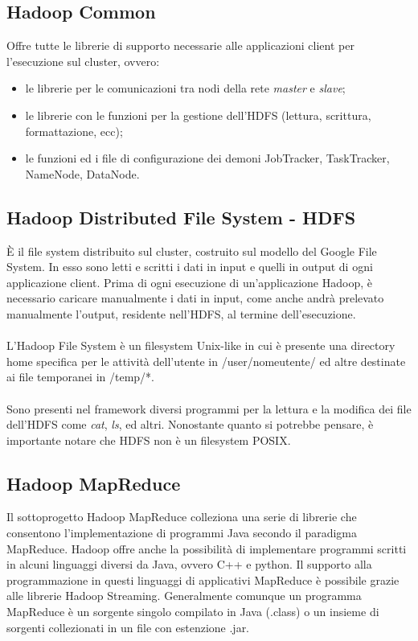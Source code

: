 \documentclass[a4paper,11pt]{report}
\begin{document}
\subsection{Hadoop Common}
Offre tutte le librerie di supporto necessarie alle applicazioni client per l'esecuzione sul cluster, ovvero:
\begin{itemize}
 \item le librerie per le comunicazioni tra nodi della rete \emph{master} e \emph{slave};
 \item le librerie con le funzioni per la gestione dell'HDFS (lettura, scrittura, formattazione, ecc); 
 \item le funzioni ed i file di configurazione dei demoni JobTracker, TaskTracker, NameNode, DataNode.
\end{itemize}
\subsection{Hadoop Distributed File System - HDFS}
È il file system distribuito sul cluster, costruito sul modello del Google File System. In esso sono letti e scritti i dati in input e
quelli in output di ogni applicazione client.
Prima di ogni esecuzione di un'applicazione Hadoop, è necessario caricare manualmente i dati in input, come anche andrà prelevato
manualmente l'output, residente nell'HDFS, al termine 
dell'esecuzione.
\paragraph{}
L'Hadoop File System è un filesystem Unix-like in cui è presente una directory home specifica per le attività dell'utente in
/user/nomeutente/ ed altre destinate ai file temporanei 
in /temp/*.
\paragraph{}
Sono presenti nel framework diversi programmi per la lettura e la modifica dei file dell'HDFS come \emph{cat}, \emph{ls}, ed altri.
Nonostante quanto si potrebbe pensare, è importante
notare che HDFS non è un filesystem POSIX.
\subsection{Hadoop MapReduce}
Il sottoprogetto Hadoop MapReduce colleziona una serie di librerie che consentono l'implementazione di programmi Java secondo il paradigma
MapReduce. Hadoop offre anche la possibilità di
implementare programmi scritti in alcuni linguaggi diversi da Java, ovvero C++ e python. Il supporto alla programmazione in questi linguaggi
di applicativi MapReduce
è possibile grazie alle librerie Hadoop Streaming. Generalmente comunque un programma MapReduce è un sorgente singolo compilato in Java
(.class) o un insieme di sorgenti collezionati in
un file con estenzione .jar. 
\end{document}
